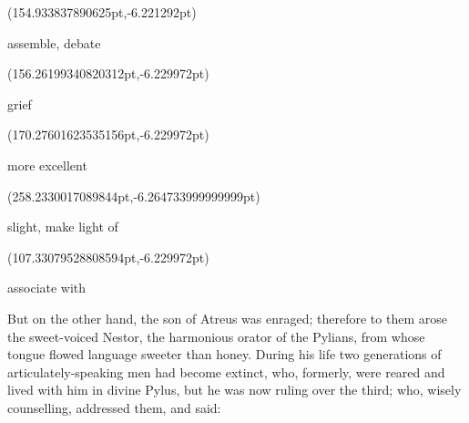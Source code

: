 \documentclass{ransom}
\begin{document}
\begin{foreignpage}
{\begin{textblock*}{55.99405pt}(154.933837890625pt,\pdfpageheight-368.3775939941406pt-6.221292pt)\parbox[b]{55.99405pt}{\begin{blacktext}\begin{latin}assemble, debate\end{latin}\end{blacktext}}\end{textblock*}
\begin{textblock*}{34.13515pt}(156.26199340820312pt,\pdfpageheight-368.3775939941406pt-6.229972pt)\parbox[b]{34.13515pt}{\begin{blacktext}\begin{latin}grief\end{latin}\end{blacktext}}\end{textblock*}
\begin{textblock*}{41.81866pt}(170.27601623535156pt,\pdfpageheight-206.37759399414062pt-6.229972pt)\parbox[b]{41.81866pt}{\begin{blacktext}\begin{latin}more excellent\end{latin}\end{blacktext}}\end{textblock*}
\begin{textblock*}{96.76699829101562pt}(258.2330017089844pt,\pdfpageheight-179.37759399414062pt-6.264733999999999pt)\parbox[b]{96.76699829101562pt}{\begin{blacktext}\begin{latin}slight, make light of\end{latin}\end{blacktext}}\end{textblock*}
\begin{textblock*}{44.43776pt}(107.33079528808594pt,\pdfpageheight-179.37759399414062pt-6.229972pt)\parbox[b]{44.43776pt}{\begin{blacktext}\begin{latin}associate with\end{latin}\end{blacktext}}\end{textblock*}
 }
\end{foreignpage}


But on the other hand, the son
of Atreus was enraged; therefore to them arose the sweet-voiced Nestor, the harmonious orator of the Pylians, from whose tongue flowed
language sweeter than honey. During his life two generations of
articulately-speaking men had become extinct, who, formerly, were
reared and lived with him in divine Pylus, but he was now ruling over
the third; who, wisely counselling, addressed them, and said:
\end{document}
